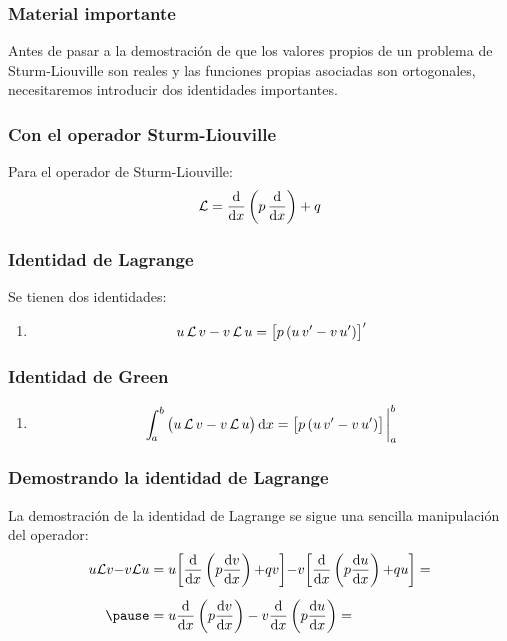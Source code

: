 \documentclass[12pt]{beamer}
\begin{document}
\begin{frame}
\frametitle{Material importante}
Antes de pasar a la demostración de que los valores propios de un problema de Sturm-Liouville son reales y las funciones propias asociadas son ortogonales, \pause necesitaremos introducir dos identidades importantes.
\end{frame}
\begin{frame}
\frametitle{Con el operador Sturm-Liouville}
Para el operador de Sturm-Liouville:
\pause
\begin{align*}
\mathcal{L} = \dv{x} \left( p \, \dv{x} \right) + q
\end{align*}
\end{frame}
\begin{frame}
\frametitle{Identidad de Lagrange}
Se tienen dos identidades:
\\
\bigskip
\pause
{}
\begin{enumerate}
\item {} 
\begin{align*}
u \, \mathcal{L} \, v - v \, \mathcal{L} \, u = \big[ p \, (u \, {v}^{\prime} - v \, {u}^{\prime}) \big]^{\prime}
\end{align*}
\seti
\end{enumerate}
\end{frame}
\begin{frame}
\frametitle{Identidad de Green}
\begin{enumerate}
\conti
\item {} 
\begin{align*}
\scaleint{5ex}_{\bs a}^{b} \, \big(u \, \mathcal{L} \, v - v \, \mathcal{L} \, u \big) \dd{x} = \big[ p \, (u \, \pderivada{v} - v \, \pderivada{u}) \big]\eval_{a}^{b}
\end{align*}
\end{enumerate}
\end{frame}
\begin{frame}
\frametitle{Demostrando la identidad de Lagrange}
La demostración de la identidad de Lagrange se sigue una sencilla manipulación del operador:
\pause
\begin{eqnarray*}
\begin{aligned}[b]
u  \mathcal{L} v {-} v \mathcal{L} u &= u \bigg[ \dv{x} \left( p \dv{v}{x} \right) {+} q v \bigg] {-} v \bigg[ \dv{x} \left( p \dv{u}{x} \right) {+} q u \bigg] = \\[0.5em] \pause
&= u \dv{x} \left( p \dv{v}{x} \right) - v \dv{x} \left( p \dv{u}{x} \right) = \\[0.5em]
\end{aligned}
\end{eqnarray*}
\end{frame}
\end{document}
